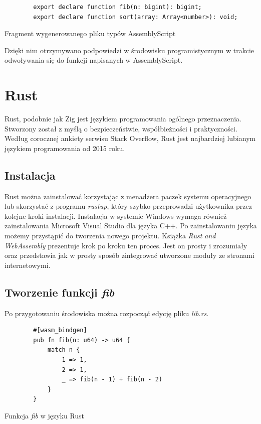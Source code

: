 \documentclass[language=polish,type=master]{aghmodern}
\begin{document}
\begin{listing}[H]
    \begin{verbatim}
        export declare function fib(n: bigint): bigint;
        export declare function sort(array: Array<number>): void;
    \end{verbatim}
    \caption{Fragment wygenerowanego pliku typów AssemblyScript}
\end{listing}

Dzięki nim otrzymywano podpowiedzi w środowisku programistycznym w trakcie odwoływania się do funkcji napisanych w AssemblyScript.

\section{Rust}
Rust, podobnie jak Zig jest językiem programowania ogólnego przeznaczenia.
Stworzony został z myślą o bezpieczeństwie, współbieżności i praktyczności.
Według corocznej ankiety serwisu Stack Overflow\footnotemark{}, Rust jest najbardziej lubianym językiem programowania od 2015 roku.

\subsection{Instalacja}
Rust można zainstalować korzystając z menadżera paczek systemu operacyjnego lub skorzystać z programu \emph{rustup}\footnotemark{}, który szybko przeprowadzi użytkownika przez kolejne kroki instalacji.
Instalacja w systemie Windows wymaga również zainstalowania Microsoft Visual Studio dla języka C++.
Po zainstalowaniu języka możemy przystąpić do tworzenia nowego projektu.
Książka \emph{Rust and WebAssembly}\footnotemark{} prezentuje krok po kroku ten proces.
Jest on prosty i zrozumiały oraz przedstawia jak w prosty sposób zintegrować utworzone moduły ze stronami internetowymi.

\subsection{Tworzenie funkcji \emph{fib}}
Po przygotowaniu środowiska można rozpocząć edycję pliku \emph{lib.rs}.

\begin{listing}[H]
    \begin{verbatim}
        #[wasm_bindgen]
        pub fn fib(n: u64) -> u64 {
            match n {
                1 => 1,
                2 => 1,
                _ => fib(n - 1) + fib(n - 2)
            }
        }
    \end{verbatim}
    \caption{Funkcja \emph{fib} w języku Rust}
\end{listing}
\end{document}
